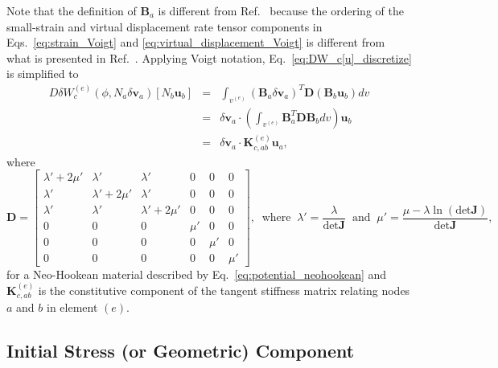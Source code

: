 \documentclass[12pt,aps,pre]{revtex4}
\begin{document}
%
Note that the definition of $\pmb{B}_a$ is different from Ref.\  because the ordering of the small-strain and virtual displacement rate tensor components in Eqs.\ \eqref{eq:strain_Voigt} and \eqref{eq:virtual_displacement_Voigt} is different from what is presented in Ref.\ . Applying Voigt notation, Eq.\ \eqref{eq:DW_c[u]_discretize} is simplified to
%
\begin{eqnarray}
D\delta W_c^{(e)}(\phi,N_a\delta \pmb{v}_a)[N_b\pmb{u}_b] &=& \int_{v^{(e)}}(\pmb{B}_a \delta \pmb{v}_a)^T \pmb{D} (\pmb{B}_b \pmb{u}_b) dv \nonumber\\
%
&=& \delta \pmb{v}_a \cdot \left(\int_{v^{(e)}} \pmb{B}_a^T \pmb{D} \pmb{B}_b  dv \right)\pmb{u}_b \nonumber\\
%
&=& \delta \pmb{v}_a \cdot \pmb{K}^{(e)}_{c,ab} \pmb{u}_a,
\end{eqnarray}
%
where
%
\begin{equation}
\pmb{D} = \begin{bmatrix}
\lambda' + 2\mu' & \lambda' & \lambda' & 0 & 0 & 0 \\
\lambda' & \lambda'+2\mu' & \lambda' & 0 & 0 & 0 \\
\lambda' & \lambda' & \lambda'+2\mu' & 0 & 0 & 0 \\
0 & 0 & 0 & \mu' & 0 & 0  \\
0 & 0 & 0 & 0 & \mu' & 0 \\
0 & 0 & 0 & 0 & 0 & \mu'  
\end{bmatrix}, \ \text{ where } \ \lambda' = \frac{\lambda}{\text{det}\pmb{J}} \ \text{ and } \ \mu' = \frac{\mu - \lambda \ln(\text{det}\pmb{J})}{\text{det}\pmb{J}},
\end{equation}
%
for a Neo-Hookean material described by Eq.\ \eqref{eq:potential_neohookean} and $\pmb{K}^{(e)}_{c,ab}$ is the constitutive component of the tangent stiffness matrix relating nodes $a$ and $b$ in element $(e)$.

\subsection{Initial Stress (or Geometric) Component}
\end{document}
